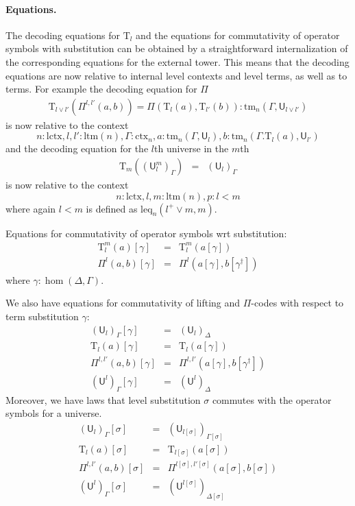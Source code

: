 \documentclass[11pt,a4paper]{article}
\theoremstyle{definition}
\newcommand{\UU}{\mathsf{U}}
\def\UU{\mathsf{U}}
\newcommand{\N}{\mathsf{N}}
\def\lctx{\mathrm{lctx}}
\def\ltm{\mathrm{ltm}}
\def\leq{\mathrm{leq}}
\newcommand{\ctx}{\mathrm{ctx}}
\newcommand{\tm}{\mathrm{tm}}
\def\U{\mathsf{U}}
\newcommand{\Ta}{\mathrm{T}}
\begin{document}
\paragraph{Equations.}
The decoding equations for $\Ta_l$ and the equations for commutativity of operator symbols with substitution can be obtained by a straightforward internalization of the corresponding equations for the external tower. This means that the decoding equations are now relative to internal level contexts and level terms, as well as to terms. For example the decoding equation for $\Pi$ 
\begin{eqnarray*}
\Ta_{l \vee l'}(\Pi^{l,l'}(a,b)) = \Pi(\Ta_l(a),\Ta_{l'}(b)) :\tm_n(\Gamma,\UU_{l \vee l'})
\end{eqnarray*}
is now relative to the context
$$
n : \lctx, l, l' : \ltm(n), \Gamma : \ctx_n, a : \tm_n(\Gamma,\UU_l), b : \tm_n(\Gamma.\Ta_l(a),\UU_{l'} )
$$
and the decoding equation for the $l$th universe in the $m$th
\begin{eqnarray*}
\Ta_{m}((\UU^m_l)_\Gamma) &=& (\UU_l)_\Gamma
\end{eqnarray*}
is now relative to the context
$$
n : \lctx, l, m : \ltm(n), p : l < m
$$
where again $l < m$ is defined as $\leq_n(l^+ \vee m, m)$.

Equations for commutativity of operator symbols wrt substitution:
\begin{eqnarray*}
\Ta^m_l(a) [ \gamma ] &=& \Ta^m_l(a[ \gamma ] )\\
\Pi^{l}(a,b)[ \gamma ] &=& \Pi^{l}(a [ \gamma ], b[ \gamma^\dagger ])
\end{eqnarray*}
 where $\gamma : \hom(\Delta,\Gamma)$.
 
We also have equations for commutativity of lifting and $\Pi$-codes with respect to term substitution $\gamma$:
 \begin{eqnarray*}
(\U_l)_\Gamma [ \gamma ] &=& (\U_l)_\Delta\\
\Ta_l(a) [ \gamma ] &=& \Ta_l(a[ \gamma ] )\\
\Pi^{l,l'}(a,b)[ \gamma ] &=& \Pi^{l,l'}(a [ \gamma ], b[ \gamma^\dagger ])\\
(\UU^l)_\Gamma[ \gamma ] &=&(\UU^l)_\Delta
\end{eqnarray*}
Moreover, we have laws that level substitution $\sigma$ commutes with the operator symbols for a universe.
 \begin{eqnarray*}
 (\U_{l})_\Gamma[\sigma] &=& (\U_{l[\sigma]})_{\Gamma[\sigma]}\\
 \Ta_l(a) [ \sigma ] &=& \Ta_{l[\sigma]}(a[ \sigma ] )\\
\Pi^{l,l'}(a,b)[ \sigma ] &=& \Pi^{l[ \sigma ] ,l'[ \sigma ] }(a [ \sigma ], b[ \sigma])\\
(\UU^l)_\Gamma[ \sigma ] &=&(\UU^{l[ \sigma ]} )_{\Delta[ \sigma ]} 
 \end{eqnarray*}
\end{document}
